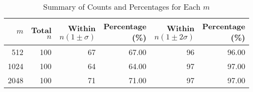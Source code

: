 \begin{table}[htbp]
\centering
\caption{Summary of Counts and Percentages for Each $m$}
\begin{tabular}{rrrrrr}
\toprule
$m$ & Total $n$ & Within $n(1 \pm \sigma)$ & Percentage (\%) & Within $n(1 \pm 2\sigma)$ & Percentage (\%)\\
\midrule
512 & 100 & 67 & 67.00 & 96 & 96.00\\
1024 & 100 & 64 & 64.00 & 97 & 97.00\\
2048 & 100 & 71 & 71.00 & 97 & 97.00\\
\bottomrule
\end{tabular}
\label{tab:summary_counts}
\end{table}
